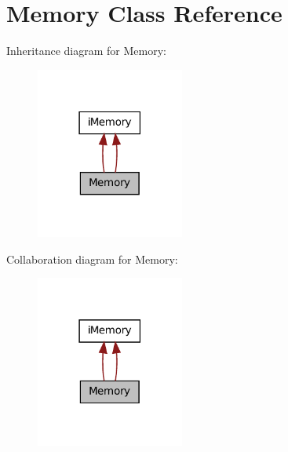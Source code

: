 \hypertarget{classMemory}{
\section{Memory Class Reference}
\label{classMemory}
}


Inheritance diagram for Memory:\nopagebreak
\begin{figure}[H]
\begin{center}
\leavevmode
\includegraphics[width=138pt]{classMemory__inherit__graph}
\end{center}
\end{figure}


Collaboration diagram for Memory:\nopagebreak
\begin{figure}[H]
\begin{center}
\leavevmode
\includegraphics[width=138pt]{classMemory__coll__graph}
\end{center}
\end{figure}
